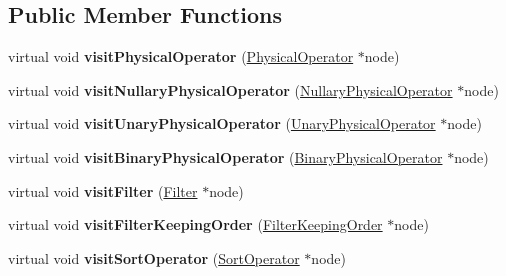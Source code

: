 \subsection*{Public Member Functions}
\begin{DoxyCompactItemize}
\item 
\hypertarget{class_physical_operator_visitor_ade4ed0dbaeb788b5d6dda5aa067ae0b2}{virtual void {\bfseries visit\+Physical\+Operator} (\hyperlink{class_physical_operator}{Physical\+Operator} $\ast$node)}\label{class_physical_operator_visitor_ade4ed0dbaeb788b5d6dda5aa067ae0b2}

\item 
\hypertarget{class_physical_operator_visitor_a03d012d93fa1e96bb95b557bfe0b8d0d}{virtual void {\bfseries visit\+Nullary\+Physical\+Operator} (\hyperlink{class_nullary_physical_operator}{Nullary\+Physical\+Operator} $\ast$node)}\label{class_physical_operator_visitor_a03d012d93fa1e96bb95b557bfe0b8d0d}

\item 
\hypertarget{class_physical_operator_visitor_a9e7270113ed6048b7718dd946ec00ea0}{virtual void {\bfseries visit\+Unary\+Physical\+Operator} (\hyperlink{class_unary_physical_operator}{Unary\+Physical\+Operator} $\ast$node)}\label{class_physical_operator_visitor_a9e7270113ed6048b7718dd946ec00ea0}

\item 
\hypertarget{class_physical_operator_visitor_a19de8665b918063e1be43304aa2286e9}{virtual void {\bfseries visit\+Binary\+Physical\+Operator} (\hyperlink{class_binary_physical_operator}{Binary\+Physical\+Operator} $\ast$node)}\label{class_physical_operator_visitor_a19de8665b918063e1be43304aa2286e9}

\item 
\hypertarget{class_physical_operator_visitor_a30731ff26547314b268e1166f10e57ee}{virtual void {\bfseries visit\+Filter} (\hyperlink{class_filter}{Filter} $\ast$node)}\label{class_physical_operator_visitor_a30731ff26547314b268e1166f10e57ee}

\item 
\hypertarget{class_physical_operator_visitor_a87aa256f7633364ab8fea61a4a20dd19}{virtual void {\bfseries visit\+Filter\+Keeping\+Order} (\hyperlink{class_filter_keeping_order}{Filter\+Keeping\+Order} $\ast$node)}\label{class_physical_operator_visitor_a87aa256f7633364ab8fea61a4a20dd19}

\item 
\hypertarget{class_physical_operator_visitor_ae5f81c64ca3acfa04737fc6655d72767}{virtual void {\bfseries visit\+Sort\+Operator} (\hyperlink{class_sort_operator}{Sort\+Operator} $\ast$node)}\label{class_physical_operator_visitor_ae5f81c64ca3acfa04737fc6655d72767}


\end{DoxyCompactItemize}
